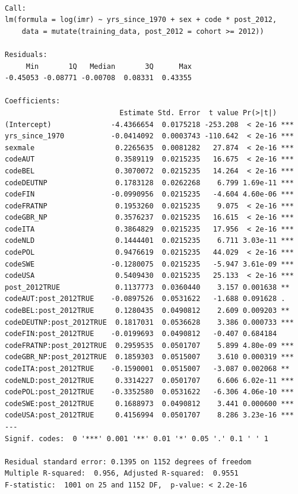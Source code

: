 \documentclass[
  letterpaper,
  DIV=11,
  numbers=noendperiod]{scrartcl}
\begin{document}
\begin{verbatim}

Call:
lm(formula = log(imr) ~ yrs_since_1970 + sex + code * post_2012, 
    data = mutate(training_data, post_2012 = cohort >= 2012))

Residuals:
     Min       1Q   Median       3Q      Max 
-0.45053 -0.08771 -0.00708  0.08331  0.43355 

Coefficients:
                           Estimate Std. Error  t value Pr(>|t|)    
(Intercept)              -4.4366654  0.0175218 -253.208  < 2e-16 ***
yrs_since_1970           -0.0414092  0.0003743 -110.642  < 2e-16 ***
sexmale                   0.2265635  0.0081282   27.874  < 2e-16 ***
codeAUT                   0.3589119  0.0215235   16.675  < 2e-16 ***
codeBEL                   0.3070072  0.0215235   14.264  < 2e-16 ***
codeDEUTNP                0.1783128  0.0262268    6.799 1.69e-11 ***
codeFIN                  -0.0990956  0.0215235   -4.604 4.60e-06 ***
codeFRATNP                0.1953260  0.0215235    9.075  < 2e-16 ***
codeGBR_NP                0.3576237  0.0215235   16.615  < 2e-16 ***
codeITA                   0.3864829  0.0215235   17.956  < 2e-16 ***
codeNLD                   0.1444401  0.0215235    6.711 3.03e-11 ***
codePOL                   0.9476619  0.0215235   44.029  < 2e-16 ***
codeSWE                  -0.1280075  0.0215235   -5.947 3.61e-09 ***
codeUSA                   0.5409430  0.0215235   25.133  < 2e-16 ***
post_2012TRUE             0.1137773  0.0360440    3.157 0.001638 ** 
codeAUT:post_2012TRUE    -0.0897526  0.0531622   -1.688 0.091628 .  
codeBEL:post_2012TRUE     0.1280435  0.0490812    2.609 0.009203 ** 
codeDEUTNP:post_2012TRUE  0.1817031  0.0536628    3.386 0.000733 ***
codeFIN:post_2012TRUE    -0.0199693  0.0490812   -0.407 0.684184    
codeFRATNP:post_2012TRUE  0.2959535  0.0501707    5.899 4.80e-09 ***
codeGBR_NP:post_2012TRUE  0.1859303  0.0515007    3.610 0.000319 ***
codeITA:post_2012TRUE    -0.1590001  0.0515007   -3.087 0.002068 ** 
codeNLD:post_2012TRUE     0.3314227  0.0501707    6.606 6.02e-11 ***
codePOL:post_2012TRUE    -0.3352580  0.0531622   -6.306 4.06e-10 ***
codeSWE:post_2012TRUE     0.1688973  0.0490812    3.441 0.000600 ***
codeUSA:post_2012TRUE     0.4156994  0.0501707    8.286 3.23e-16 ***
---
Signif. codes:  0 '***' 0.001 '**' 0.01 '*' 0.05 '.' 0.1 ' ' 1

Residual standard error: 0.1395 on 1152 degrees of freedom
Multiple R-squared:  0.956, Adjusted R-squared:  0.9551 
F-statistic:  1001 on 25 and 1152 DF,  p-value: < 2.2e-16
\end{verbatim}
\end{document}
